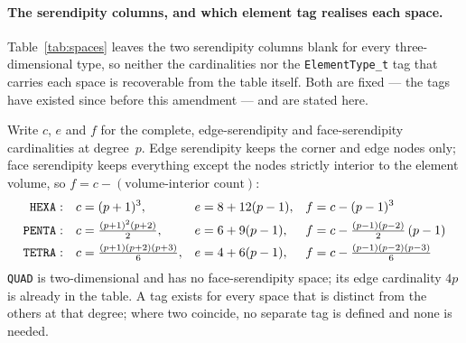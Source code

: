 \documentclass[11pt,letterpaper]{article}
\newif\ifvfourdraft
\newenvironment{v4block}{\ifvfourdraft\color{v4violet}\fi\ignorespaces}{\par}
\newcommand{\vfourmark}{\ifvfourdraft\textcolor{v4violet}{\textbf{[v4]}}\ \fi}
\begin{document}
\begin{v4block}
\paragraph{\vfourmark The serendipity columns, and which element tag realises each space.}
\label{sec:serendipity-tags}
Table~\ref{tab:spaces} leaves the two serendipity columns blank for every
three-dimensional type, so neither the cardinalities nor the
\texttt{ElementType\_t} tag that carries each space is recoverable from the table
itself.  Both are fixed --- the tags have existed since before this amendment ---
and are stated here.

Write $c$, $e$ and $f$ for the complete, edge-serendipity and face-serendipity
cardinalities at degree~$p$.  Edge serendipity keeps the corner and edge nodes
only; face serendipity keeps everything except the nodes strictly interior to the
element volume, so $f = c - (\text{volume-interior count})$:
%
\begin{align*}
  \text{\texttt{HEXA}}  &: & c &= (p+1)^3, & e &= 8 + 12(p-1), & f &= c - (p-1)^3 \\
  \text{\texttt{PENTA}} &: & c &= \tfrac{(p+1)^2(p+2)}{2}, & e &= 6 + 9(p-1),
      & f &= c - \tfrac{(p-1)(p-2)}{2}\,(p-1) \\
  \text{\texttt{TETRA}} &: & c &= \tfrac{(p+1)(p+2)(p+3)}{6}, & e &= 4 + 6(p-1),
      & f &= c - \tfrac{(p-1)(p-2)(p-3)}{6}
\end{align*}
%
\texttt{QUAD} is two-dimensional and has no face-serendipity space; its edge
cardinality $4p$ is already in the table.  A tag exists for every space that is
distinct from the others at that degree; where two coincide, no separate tag is
defined and none is needed.


\end{v4block}
\end{document}
